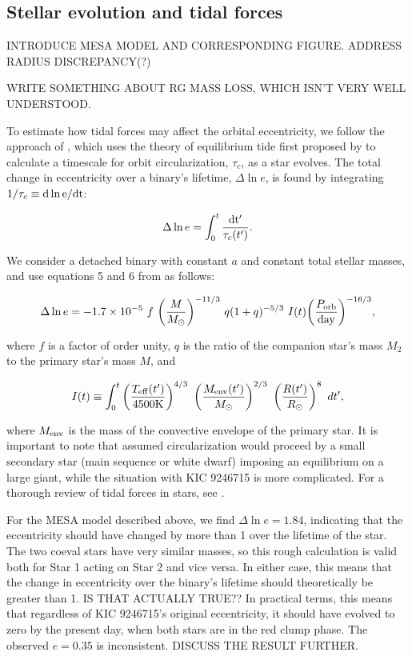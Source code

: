 \subsection{Stellar evolution and tidal forces}\label{tides}

INTRODUCE MESA MODEL AND CORRESPONDING FIGURE. ADDRESS RADIUS DISCREPANCY(?)

WRITE SOMETHING ABOUT RG MASS LOSS, WHICH ISN'T VERY WELL UNDERSTOOD.

To estimate how tidal forces may affect the orbital eccentricity, we follow the approach of \citet{ver95}, which uses the theory of equilibrium tide first proposed by \citet{zah77} to calculate a timescale for orbit circularization, $\tau_c$, as a star evolves. The total change in eccentricity over a binary's lifetime, $\Delta \ln e$, is found by integrating $1/\tau_c \equiv \rm{d} \ln e / \rm{d}t$:

\begin{equation}\label{circ}
\Delta \ln e = \int_0^t \frac{\rm{d}t'}{\tau_c(t')}.
\end{equation}

We consider a detached binary with constant $a$ and constant total stellar masses, and use equations 5 and 6 from \citet{ver95} as follows:

\begin{equation}\label{tide1}
\Delta \ln e = -1.7 \times 10^{-5} \ f \ {\left( \frac{M}{M_{\odot}} \right)}^{-11/3} \ q(1+q)^{-5/3} \ I(t) {\left( \frac{P_{\rm{orb}}}{\rm{day}} \right)}^{-16/3},
\end{equation}

where $f$ is a factor of order unity, $q$ is the ratio of the companion star's mass $M_2$ to the primary star's mass $M$, and

\begin{equation}
I(t) \equiv \int_0^t \left( \frac{T_{\rm{eff}}(t')}{4500 \rm{K}} \right)^{4/3} \ \left( \frac{M_{\rm{env}}(t')}{M_{\odot}} \right)^{2/3} \ \left( \frac{R(t')}{R_{\odot}} \right)^8 \ dt',
\end{equation}

where $M_{\rm{env}}$ is the mass of the convective envelope of the primary star. It is important to note that \citet{ver95} assumed circularization would proceed by a small secondary star (main sequence or white dwarf) imposing an equilibrium on a large giant, while the situation with KIC 9246715 is more complicated. For a thorough review of tidal forces in stars, see \citet{ogi14}.

For the MESA model described above, we find $\Delta \ln e = 1.84$, indicating that the eccentricity should have changed by more than 1 over the lifetime of the star. The two coeval stars have very similar masses, so this rough calculation is valid both for Star 1 acting on Star 2 and vice versa. In either case, this means that the change in eccentricity over the binary's lifetime should theoretically be greater than 1. IS THAT ACTUALLY TRUE?? In practical terms, this means that regardless of KIC 9246715's original eccentricity, it should have evolved to zero by the present day, when both stars are in the red clump phase. The observed $e = 0.35$ is inconsistent. DISCUSS THE RESULT FURTHER.

